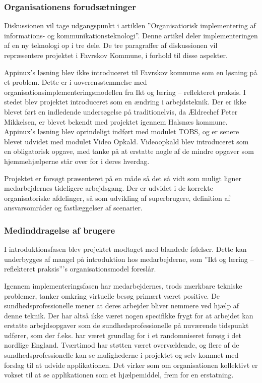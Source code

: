 \subsubsection{Organisationens forudsætninger}
Diskussionen vil tage udgangspunkt i artiklen ”Organisatiorisk implementering af informations- og kommunikationsteknologi”. Denne artikel deler implementeringen af en ny teknologi op i tre dele. De tre paragraffer af diskussionen vil repræsentere projektet i Favrskov Kommune, i forhold til disse aspekter.

Appinux’s løsning blev ikke introduceret til Favrskov kommune som en løsning på et problem. Dette er i uoverensstemmelse med organisationsimplementeringsmodellen fra Ikt og læring – reflekteret praksis. I stedet blev projektet introduceret som en ændring i arbejdsteknik. Der er ikke blevet ført en indledende undersøgelse på traditionelvis, da Ældrechef Peter Mikkelsen, er blevet bekendt med projektet igennem Halsnæs kommune. Appinux’s løsning blev oprindeligt indført med modulet TOBS, og er senere blevet udvidet med modulet Video Opkald. Videoopkald blev introduceret som en obligatorisk opgave, med tanke på at erstatte nogle af de mindre opgaver som hjemmehjælperne står over for i deres hverdag. 

Projektet er forsøgt præsenteret på en måde så det så vidt som muligt ligner medarbejdernes tideligere arbejdsgang. Der er udvidet i de korrekte organisatoriske afdelinger, så som udvikling af superbrugere, definition af ansvarsområder og fastlæggelser af scenarier. 

\subsubsection{Medinddragelse af brugere}
I introduktionsfasen blev projektet modtaget med blandede følelser. Dette kan underbygges af mangel på introduktion hos medarbejderne, som ”Ikt og læring – reflekteret praksis”’s organisationsmodel foreslår. 

Igennem implementeringsfasen har medarbejdernes, trods mærkbare tekniske problemer, tanker omkring virtuelle besøg primært været positive. De sundhedsprofessionelle mener at deres arbejder bliver nemmere ved hjælp af denne teknik. Der har altså ikke været nogen specifikke frygt for at arbejdet kan erstatte arbejdsopgaver som de sundhedsprofessionelle på nuværende tidspunkt udfører, som der f.eks. har været grundlag for i et randomniseret forsøg i det nordlige England\cite{Mair}. Tværtimod har støtten været overvældende, og flere af de sundhedsprofessionelle kan se mulighederne i projektet og selv kommet med forslag til at udvide applikationen. Det virker som om organisationen kollektivt er vokset til at se applikationen som et hjælpemiddel, frem for en erstatning.

